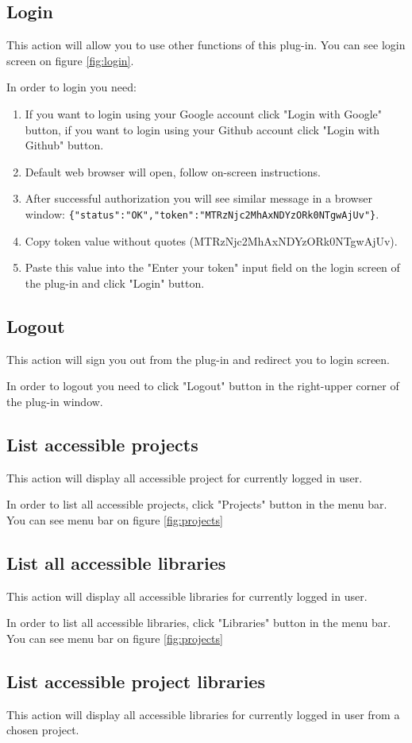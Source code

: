 \documentclass[thesis=B,english]{FITthesis}[2012/10/20]
\begin{document}
\subsection{Login}
This action will allow you to use other functions of this plug-in. You can see login screen on figure \ref{fig:login}.

In order to login you need:
	\begin{enumerate}
		\item If you want to login using your Google account click "Login with Google" button, if you want to login using your Github account click "Login with Github" button.
		\item Default web browser will open, follow on-screen instructions.
		\item After successful authorization you will see similar message in a browser window: \texttt{\{"status":"OK","token":"MTRzNjc2MhAxNDYzORk0NTgwAjUv"\}}.
		\item Copy token value without quotes (MTRzNjc2MhAxNDYzORk0NTgwAjUv).
		\item Paste this value into the "Enter your token" input field on the login screen of the plug-in and click "Login" button.
	\end{enumerate}
\subsection{Logout}
This action will sign you out from the plug-in and redirect you to login screen.

In order to logout you need to click "Logout" button in the right-upper corner of the plug-in window.
\subsection{List accessible projects}
This action will display all accessible project for currently logged in user.

In order to list all accessible projects, click "Projects" button in the menu bar. You can see menu bar on figure \ref{fig:projects}
\subsection{List all accessible libraries}
This action will display all accessible libraries for currently logged in user.

In order to list all accessible libraries, click "Libraries" button in the menu bar. You can see menu bar on figure \ref{fig:projects}
\subsection{List accessible project libraries}
This action will display all accessible libraries for currently logged in user from a chosen project.
\end{document}
